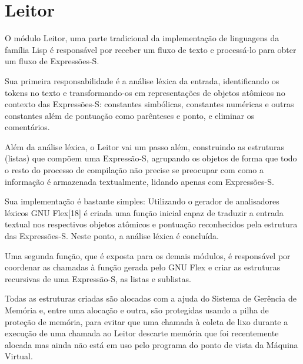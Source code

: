 \section{Leitor}
\label{sec:leitor}

O módulo Leitor, uma parte tradicional da implementação de linguagens da
família Lisp é responsável por receber um fluxo de texto e processá-lo para
obter um fluxo de Expressões-S.

Sua primeira responsabilidade é a análise léxica da entrada, identificando os
tokens no texto e transformando-os em representações de objetos atômicos no
contexto das Expressões-S: constantes simbólicas, constantes numéricas e outras
constantes além de pontuação como parênteses e ponto, e eliminar os
comentários. 

Além da análise léxica, o Leitor vai um passo além, construindo as estruturas
(listas) que compõem uma Expressão-S, agrupando os objetos de forma que todo o
resto do processo de compilação não precise se preocupar com como a informação
é armazenada textualmente, lidando apenas com Expressões-S.

Sua implementação é bastante simples: Utilizando o gerador de analisadores
léxicos GNU Flex[18] é criada uma função inicial capaz de traduzir a entrada
textual nos respectivos objetos atômicos e pontuação reconhecidos pela
estrutura das Expressões-S. Neste ponto, a análise léxica é concluída. 

Uma segunda função, que é exposta para os demais módulos, é responsável por
coordenar as chamadas à função gerada pelo GNU Flex e criar as estruturas
recursivas de uma Expressão-S, as listas e sublistas.

Todas as estruturas criadas são alocadas com a ajuda do Sistema de Gerência de
Memória e, entre uma alocação e outra, são protegidas usando a pilha de
proteção de memória, para evitar que uma chamada à coleta de lixo durante a
execução de uma chamada ao Leitor descarte memória que foi recentemente alocada
mas ainda não está em uso pelo programa do ponto de vista da Máquina Virtual.




